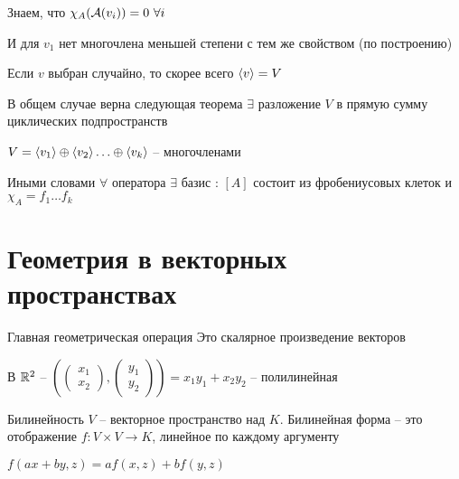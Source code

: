 \documentclass[12pt]{article}
\begin{document}
\begin{Exercise}{}
    Знаем, что $\chi_A(\mathcal{A}(v_i)) = 0\ \forall i$

    И для $v_1$ нет многочлена меньшей степени с тем же свойством (по построению)
\end{Exercise}

\begin{Remark}{}
    Если $v$ выбран случайно, то скорее всего $\langle v \rangle = V$
\end{Remark}

\begin{theo}{В общем случае верна следующая теорема}
    $\exists$ разложение $V$ в прямую сумму циклических подпространств

    $V = \langle v_1 \rangle \oplus \langle v_2 \rangle \ldots \oplus \langle v_k \rangle$ -- многочленами

    Иными словами $\forall$ оператора $\exists$ базис : $[A]$ состоит из фробениусовых клеток и $\chi_A = f_1 \ldots f_k$
\end{theo}

\section{Геометрия в векторных пространствах}

\begin{defin}{Главная геометрическая операция}
    Это скалярное произведение векторов
\end{defin}

\begin{Example}{}
    В $\mathbb R^2$ -- $\left(\begin{pmatrix}
        x_1 \\
        x_2
    \end{pmatrix}, \begin{pmatrix}
        y_1 \\
        y_2
    \end{pmatrix}\right) = x_1y_1 + x_2y_2$ -- полилинейная
\end{Example}

\begin{defin}{Билинейность}
    $V$ -- векторное пространство над $K$. Билинейная форма -- это отображение $f : V \times V \to K$, линейное по каждому аргументу

    $f(ax + by, z) = af(x, z) + bf(y, z)$
\end{defin}
\end{document}
